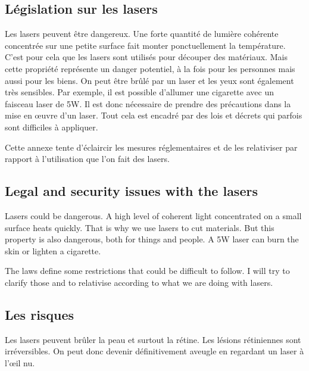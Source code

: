 \begin{appendices}

	
\clearpage
        
\begin{fr}
\section{Législation sur les lasers}
\label{sec:legislation}
Les lasers peuvent être dangereux.
Une forte quantité de lumière cohérente concentrée sur une petite surface fait monter ponctuellement la température.
C'est pour cela que les lasers sont utilisés pour découper des matériaux.
Mais cette propriété représente un danger potentiel, à la fois pour les personnes mais aussi pour les biens.
On peut être brûlé par un laser et les yeux sont également très sensibles.
Par exemple, il est possible d'allumer une cigarette avec un faisceau laser de 5\unit{W}.
Il est donc nécessaire de prendre des précautions dans la mise en \oe uvre d'un laser.
Tout cela est encadré par des lois et décrets qui parfois sont difficiles à appliquer.

Cette annexe tente d'éclaircir les mesures réglementaires et de les relativiser par rapport à l'utilisation que l'on fait des lasers.
\end{fr}

\begin{en}
\section{Legal and security issues with the lasers}
\label{sec:legislation}
Lasers could be dangerous.
A high level of coherent light concentrated on a small surface heats quickly.
That is why we use lasers to cut materials.
But this property is also dangerous, both for things and people.
A 5\unit{W} laser can burn the skin or lighten a cigarette.

The laws define some restrictions that could be difficult to follow.
I will try to clarify those and to relativise according to what we are doing with lasers.
\end{en}


\begin{fr}
\subsection*{Les risques}
	Les lasers peuvent brûler la peau et surtout la rétine. Les lésions rétiniennes sont irréversibles.
	On peut donc devenir définitivement aveugle en regardant un laser à l'\oe il nu.
	

\end{fr}
\end{appendices}
